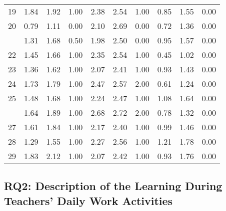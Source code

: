 \documentclass[
]{article}
\begin{document}
\begin{longtable}[t]{lccccccccc}
19 & 1.84 & 1.92 & 1.00 & 2.38 & 2.54 & 1.00 & 0.85 & 1.55 & 0.00\\
20 & 0.79 & 1.11 & 0.00 & 2.10 & 2.69 & 0.00 & 0.72 & 1.36 & 0.00\\
\addlinespace
21 & 1.31 & 1.68 & 0.50 & 1.98 & 2.50 & 0.00 & 0.95 & 1.57 & 0.00\\
22 & 1.45 & 1.66 & 1.00 & 2.35 & 2.54 & 1.00 & 0.45 & 1.02 & 0.00\\
23 & 1.36 & 1.62 & 1.00 & 2.07 & 2.41 & 1.00 & 0.93 & 1.43 & 0.00\\
24 & 1.73 & 1.79 & 1.00 & 2.47 & 2.57 & 2.00 & 0.61 & 1.24 & 0.00\\
25 & 1.48 & 1.68 & 1.00 & 2.24 & 2.47 & 1.00 & 1.08 & 1.64 & 0.00\\
\addlinespace
26 & 1.64 & 1.89 & 1.00 & 2.68 & 2.72 & 2.00 & 0.78 & 1.32 & 0.00\\
27 & 1.61 & 1.84 & 1.00 & 2.17 & 2.40 & 1.00 & 0.99 & 1.46 & 0.00\\
28 & 1.29 & 1.55 & 1.00 & 2.27 & 2.56 & 1.00 & 1.21 & 1.78 & 0.00\\
29 & 1.83 & 2.12 & 1.00 & 2.07 & 2.42 & 1.00 & 0.93 & 1.76 & 0.00\\
\bottomrule
\end{longtable}
\endgroup{}

\subsection{RQ2: Description of the Learning During Teachers' Daily Work
Activities}\label{rq2-description-of-the-learning-during-teachers-daily-work-activities}
\end{document}
